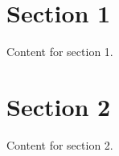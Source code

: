 \documentclass[10pt]{article}
\begin{document}
\begin{multicols}{3}

\section*{Section 1}
Content for section 1.

\section*{Section 2}
Content for section 2.


\end{multicols}
\end{document}
